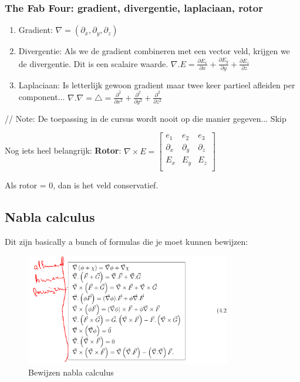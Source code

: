 \documentclass[a4paper]{article}
\begin{document}
\subsubsection{The Fab Four: gradient, divergentie, laplaciaan, rotor}

\begin{enumerate}

	\item Gradient: $\nabla = (\partial_x, \partial_y, \partial_z)$
	\item Divergentie: Als we de gradient combineren met een vector veld, krijgen we de divergentie. Dit is een scalaire waarde. $\nabla . E = \frac{\partial E_x}{\partial x} + \frac{\partial E_y}{\partial y} + \frac{\partial E_z}{\partial z}$
	\item Laplaciaan: Is letterlijk gewoon gradient maar twee keer partieel afleiden per component... $\nabla . \nabla = \triangle = \frac{\partial^2}{\partial x^2} + \frac{\partial^2}{\partial y^2} + \frac{\partial^2}{\partial z^2}$
\end{enumerate}

// Note: De toepassing in de cursus wordt nooit op die manier gegeven... Skip

Nog iets heel belangrijk: \textbf{Rotor}: $\nabla \times E = \begin{bmatrix} e_1 & e_2 & e_3 \\ \partial_x & \partial_y & \partial_z \\ E_x & E_y & E_z \\ \end{bmatrix}$

Als rotor = 0, dan is het veld conservatief.

\subsection{Nabla calculus}

Dit zijn basically a bunch of formulas die je moet kunnen bewijzen:


\begin{figure}[H]
	\centering
	\includegraphics[width=0.8\textwidth]{assets/bewijzen_nabla_calculus.png}
	\caption{Bewijzen nabla calculus}
	\label{fig:bewijzen_nabla_calculus}
\end{figure}
\end{document}
